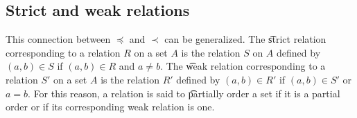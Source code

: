 \subsection*{Strict and weak relations}

This connection between $\preceq$ and $\prec$ can be generalized.
The \t{strict relation} corresponding to a relation $R$ on a set $A$ is the relation $S$ on $A$ defined by $(a, b) \in S$ if $(a, b) \in R$ and $a \neq b$.
The \t{weak relation} corresponding to a relation $S'$ on a set $A$ is the relation $R'$ defined by $(a, b) \in R'$ if $(a, b) \in S'$ or $a = b$.
For this reason, a relation is said to \t{partially order} a set if it is a partial order or if its corresponding weak relation is one.


\blankpage